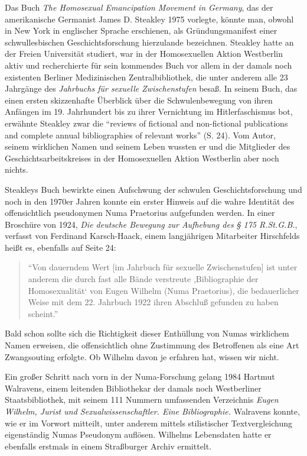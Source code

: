 \documentclass[a4paper,
fontsize=11pt,
oneside,
numbers=noperiodatend,
parskip=half-,
bibliography=totoc,
final
]{scrartcl}
\begin{document}
Das Buch \emph{The Homosexual Emancipation Movement in Germany}, das der
amerikanische Germanist James D. Steakley 1975 vorlegte, könnte man,
obwohl in New York in englischer Sprache erschienen, als
Gründungsmanifest einer schwullesbischen Geschichtsforschung hierzulande
bezeichnen. Steakley hatte an der Freien Universität studiert, war in
der Homosexuellen Aktion Westberlin aktiv und recherchierte für sein
kommendes Buch vor allem in der damals noch existenten Berliner
Medizinischen Zentralbibliothek, die unter anderem alle 23 Jahrgänge des
\emph{Jahrbuchs für sexuelle Zwischenstufen} besaß. In seinem Buch, das
einen ersten skizzenhafte Überblick über die Schwulenbewegung von ihren
Anfängen im 19. Jahrhundert bis zu ihrer Vernichtung im Hitlerfaschismus
bot, erwähnte Steakley zwar die \enquote{reviews of fictional and
non-fictional publications and complete annual bibliographies of
relevant works} (S. 24). Vom Autor, seinem wirklichen Namen und seinem
Leben wussten er und die Mitglieder des Geschichtsarbeitskreises in der
Homosexuellen Aktion Westberlin aber noch nichts.

Steakleys Buch bewirkte einen Aufschwung der schwulen
Geschichtsforschung und noch in den 1970er Jahren konnte ein erster
Hinweis auf die wahre Identität des offensichtlich pseudonymen Numa
Praetorius aufgefunden werden. In einer Broschüre von 1924, \emph{Die
deutsche Bewegung zur Aufhebung des § 175 R.St.G.B.}, verfasst von
Ferdinand Karsch-Haack, einem langjährigen Mitarbeiter Hirschfelds heißt
es, ebenfalls auf Seite 24:

\begin{quote}
\enquote{Von dauerndem Wert {[}im Jahrbuch für sexuelle
Zwischenstufen{]} ist unter anderem die durch fast alle Bände verstreute
,Bibliographie der Homosexualität` von Eugen Wilhelm (Numa Praetorius),
die bedauerlicher Weise mit dem 22. Jahrbuch 1922 ihren Abschluß
gefunden zu haben scheint.}
\end{quote}

Bald schon sollte sich die Richtigkeit dieser Enthüllung von Numas
wirklichem Namen erweisen, die offensichtlich ohne Zustimmung des
Betroffenen als eine Art Zwangsouting erfolgte. Ob Wilhelm davon je
erfahren hat, wissen wir nicht.

Ein großer Schritt nach vorn in der Numa-Forschung gelang 1984 Hartmut
Walravens, einem leitenden Bibliothekar der damals noch Westberliner
Staatsbibliothek, mit seinem 111 Nummern umfassenden Verzeichnis
\emph{Eugen Wilhelm, Jurist und Sexualwissenschaftler. Eine
Bibliographie.} Walravens konnte, wie er im Vorwort mitteilt, unter
anderem mittels stilistischer Textvergleichung eigenständig Numas
Pseudonym auflösen. Wilhelms Lebensdaten hatte er ebenfalls erstmals in
einem Straßburger Archiv ermittelt.
\end{document}
